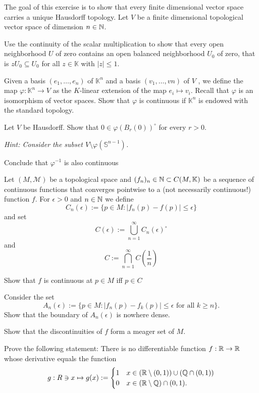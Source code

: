 \begin{Problem}
	The goal of this exercise is to show that every finite dimensional vector space carries a unique Hausdorff
	topology. Let $V$ be a finite dimensional topological vector space of dimension $n\in \mathbb{N}$.
	\begin{parts}
		\item Use the continuity of the scalar multiplication to show that every open neighborhood $U$ of zero contains an open balanced neighborhood $U_0$ of zero, that is $zU_0 \subseteq U_0$ for all $z \in \mathbb{K}$	with $|z| \le 1$.
		\item Given a basis $(e_1, \dots , e_n)$ of $\mathbb{K}^n$ and a basis $(v_1, \dots , vn)$ of $V$ , we define the map
		$\varphi: \mathbb{K}^n \to V$ as the $K$-linear extension of the map $e_i\mapsto v_i$. Recall that $\varphi$ is an isomorphism of vector spaces. Show that $\varphi$ is continuous if $\mathbb{K}^n$ is endowed with the standard topology.
		\item Let $V$ be Hausdorff. Show that $0 \in \varphi(B_r(0))^{\circ}$ for every $r > 0$.
		
		\emph{Hint: Consider the subset $V\setminus \varphi(\mathbb{S}^{n-1})$.}
		
		\item Conclude that $\varphi^{-1}$ is also continuous
	\end{parts}
\end{Problem}

\begin{Problem}
	Let $(M,\mathcal{M})$ be a topological space and $(f_n)_n\in \mathbb{N}\subset C(M, \mathbb K)$ be a sequence of continuous functions that converges pointwise to a (not necessarily continuous!) function $f$. For $\epsilon > 0$ and $n \in \mathbb{N}$ we
	define
	\[C_n(\epsilon):=\{p\in M: |f_n(p)-f(p)|\le \epsilon\}\]
	and set
	\[C(\epsilon):=\bigcup_{n=1}^\infty C_n(\epsilon)^{\circ}\]
	and
	\[C:=\bigcap_{n=1}^\infty C\left(\frac 1n\right)\]
	\begin{parts}
		\item Show that $f$ is continuous at $p\in M$ iff $p\in C$
		\item Consider the set
		\[A_n(\epsilon):=\{p\in M:|f_n(p)-f_k(p)|\le \epsilon\text{ for all }k\ge n\}.\]
		Show that the boundary of $A_n(\epsilon)$ is nowhere dense.
		\item Show that the discontinuities of $f$ form a meager set of $M$.
		\item Prove the following statement: There is no differentiable function $f:\mathbb{R} \to \mathbb{R}$ whose derivative equals the function
		\[g:R\ni x\mapsto g(x):=\begin{cases}
			1 & x\in (\mathbb{R} \setminus (0,1))\cup (\mathbb{Q} \cap (0,1))\\
			0 & x\in (\mathbb{R} \setminus \mathbb{Q})\cap (0,1).
		\end{cases}\]
	\end{parts}
\end{Problem}